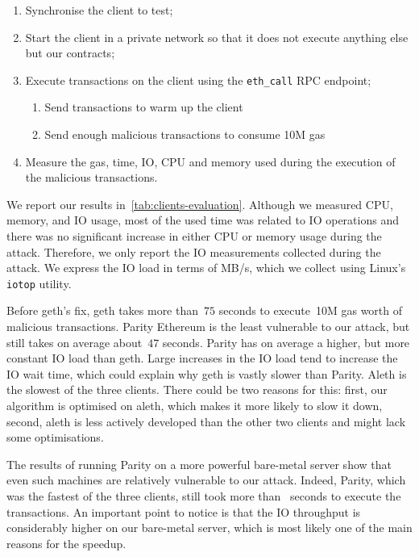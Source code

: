   \begin{enumerate}
    \item Synchronise the client to test;
    \item Start the client in a private network so that it does not execute anything else but our contracts;
    \item Execute transactions on the client using the \lstinline{eth_call} RPC endpoint;
          \begin{enumerate}
            \item Send transactions to warm up the client
            \item Send enough malicious transactions to consume 10M gas
          \end{enumerate}
    \item Measure the gas, time, IO, CPU and memory used during the execution of the malicious transactions.
  \end{enumerate}
  We report our results in~\autoref{tab:clients-evaluation}. Although we measured CPU, memory, and IO usage, most of the used time was related to IO operations and there was no significant increase in either CPU or memory usage during the attack. Therefore, we only report the IO measurements collected during the attack. We express the IO load in terms of MB/s, which we collect using Linux's \texttt{iotop} utility.

  Before geth's fix, geth takes more than~$75$ seconds to execute~10M gas worth of malicious transactions. Parity Ethereum is the least vulnerable to our attack, but still takes on average about~$47$ seconds. Parity has on average a higher, but more constant IO load than geth.
  Large increases in the IO load tend to increase the IO wait time, which could explain why geth is vastly slower than Parity. Aleth is the slowest of the three clients. There could be two reasons for this: first, our algorithm is optimised on aleth, which makes it more likely to slow it down, second, aleth is less actively developed than the other two clients and might lack some optimisations.

  The results of running Parity on a more powerful bare-metal server show that even such machines are relatively vulnerable to our attack. Indeed, Parity, which was the fastest of the three clients, still took more than~ seconds to execute the transactions. An important point to notice is that the IO throughput is considerably higher on our bare-metal server, which is most likely one of the main reasons for the speedup.


